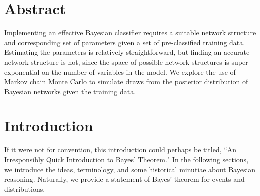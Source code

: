 \documentclass[12pt,twoside]{reedthesis}
\begin{document}
    \tableofcontents

    \chapter*{Abstract}
	Implementing an effective Bayesian classifier requires a suitable network structure and corresponding set of parameters given a set of pre-classified training data. Estimating the parameters is relatively straightforward, but finding an accurate network structure is not, since the space of possible network structures is super-exponential on the number of variables in the model. We explore the use of Markov chain Monte Carlo to simulate draws from the posterior distribution of Bayesian networks given the training data.
	

  \mainmatter %
  \pagestyle{fancyplain} %


    \chapter*{Introduction}

	If it were not for convention, this introduction could perhaps be titled, ``An Irresponsibly Quick Introduction to Bayes' Theorem." In the following sections, we introduce the ideas, terminology, and some historical minutiae about Bayesian reasoning. Naturally, we provide a statement of Bayes' theorem for events and distributions.
\end{document}
